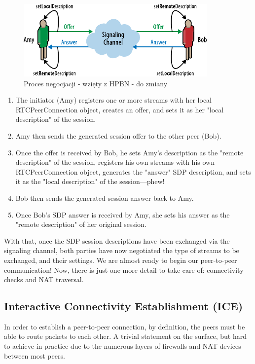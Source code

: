 \begin{figure}[H]
    \centering
    \includegraphics{img/signaling-2}
    \caption{Proces negocjacji - wzięty z HPBN - do zmiany}
    \label{fig:signaling2}
\end{figure}

\begin{enumerate}

    \item The initiator (Amy) registers one or more streams with her local RTCPeerConnection object,
          creates an offer, and sets it as her "local description" of the session.
    \item Amy then sends the generated session offer to the other peer (Bob).
    \item Once the offer is received by Bob, he sets Amy's description as the "remote description"
          of the session, registers his own streams with his own RTCPeerConnection object, generates
          the "answer" SDP description, and sets it as the "local description" of the session—phew!
    \item Bob then sends the generated session answer back to Amy.
    \item Once Bob's SDP answer is received by Amy, she sets his answer as the "remote description"
          of her original session.
\end{enumerate}

With that, once the SDP session descriptions have been exchanged via the signaling channel, both
parties have now negotiated the type of streams to be exchanged, and their settings. We are almost
ready to begin our peer-to-peer communication! Now, there is just one more detail to take care of:
connectivity checks and NAT traversal.

\subsection{Interactive Connectivity Establishment (ICE)}
\label{ice}

In order to establish a peer-to-peer connection, by definition, the peers must be able to route
packets to each other. A trivial statement on the surface, but hard to achieve in practice due to
the numerous layers of firewalls and NAT devices between most peers.


